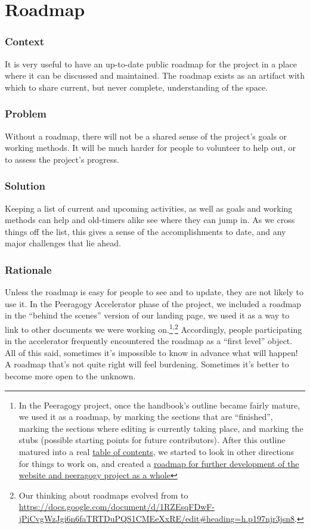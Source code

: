 \section{Roadmap} \label{sec:Roadmap}

\subsubsection*{Context} It is very useful to have an up-to-date public roadmap for the project in a place where it can be discussed and maintained. The roadmap exists as an artifact with which to share current, but never complete, understanding of the space.

\subsubsection*{Problem} Without a roadmap, there will not be a shared sense of the project's goals or working methods. It will be much harder for people to volunteer to help out, or to assess the project's progress.

\subsubsection*{Solution} Keeping a list of current and upcoming activities, as
well as goals and working methods can help  and old-timers alike see where they can jump in. As we cross things off the list, this gives a sense of the accomplishments to date, and any major challenges that lie ahead.

\subsubsection*{Rationale} Unless the roadmap is easy for people to see and to
update, they are not likely to use it. In the Peeragogy Accelerator
phase of the project, we included a roadmap in the ``behind the
scenes'' version of our landing page, we used it as a way to link to
other documents we were working on.\footnote{In the Peeragogy project, once the handbook's outline became fairly mature, we used it as a roadmap, by marking the sections that are ``finished'', marking the sections where editing is currently taking place, and marking the stubs (possible starting points for future contributors). After this outline matured into a real \href{http://peeragogy.org/table-of-contents/}{table of contents}, we started to look in other directions for things to work on, and created a \href{http://peeragogy.org/peeragogy-org-roadmap/}{roadmap for further development of the website and peeragogy project as a whole}}\textsuperscript{,}\footnote{Our thinking about roadmaps evolved from \cite{corneli2013roadmaps} to \url{https://docs.google.com/document/d/1RZEsqFDwF-jPiCvgWzJgi6n6faTRTDuPQS1CMEeXxRE/edit\#heading=h.p197njr3jsn8}.} Accordingly, people participating in the accelerator frequently encountered the roadmap as a ``first level'' object. All of this said, sometimes it's impossible to know in advance what will happen! A roadmap that's not quite right will feel burdening. Sometimes it's better to become more open to the unknown.

